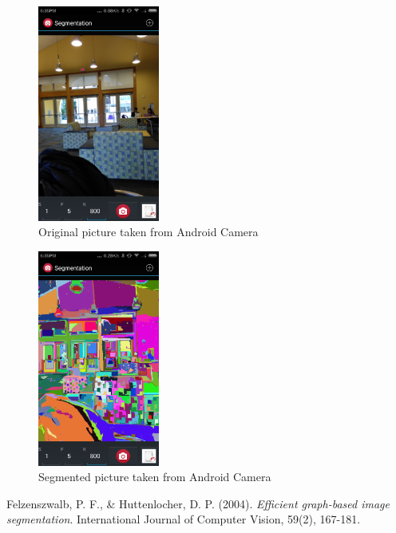 \documentclass[12pt, english, titlepage]{article}
\begin{document}
\begin{figure}[ht]
  \begin{center}
    \includegraphics[width=40mm]{./img/screensh.png}
  \end{center}
\caption{Original picture taken from Android Camera}
\label{og}
\end{figure}

\begin{figure}[ht]
  \begin{center}
    \includegraphics[width=40mm]{./img/screenshSEG.png}
  \end{center}
\caption{Segmented picture taken from Android Camera}
\label{ogs}
\end{figure}

\begin{thebibliography}{2}
\small

Felzenszwalb, P. F., \& Huttenlocher, D. P. (2004).
	\emph{Efficient graph-based image segmentation}.
	International Journal of Computer Vision, 59(2), 167-181.

\end{thebibliography}
\end{document}
